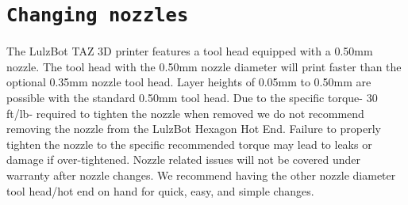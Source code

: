 \section{\texttt{Changing nozzles}}
The LulzBot TAZ 3D printer features a tool head equipped with a 0.50mm nozzle. The tool head with the 0.50mm nozzle diameter will print faster than the optional 0.35mm nozzle tool head. Layer heights of 0.05mm to 0.50mm are possible with the standard 0.50mm tool head.  Due to the specific torque- 30 ft/lb- required to tighten the nozzle when removed we do not recommend removing the nozzle from the LulzBot\textsuperscript{\miniscule{\textregistered}} Hexagon Hot End. Failure to properly tighten the nozzle to the specific recommended torque may lead to leaks or damage if over-tightened. Nozzle related issues will not be covered under warranty after nozzle changes. We recommend having the other nozzle diameter tool head/hot end on hand for quick, easy, and simple changes.



